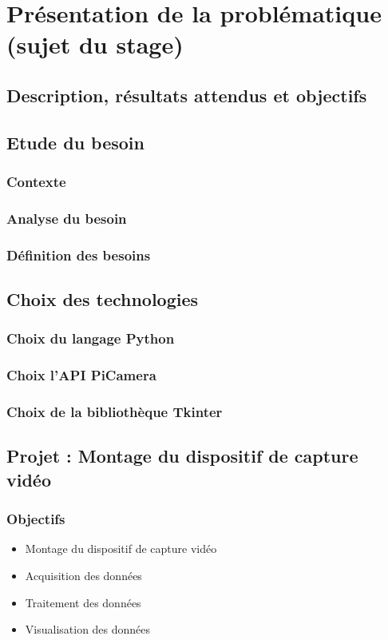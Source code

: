\chapter{Présentation de la problématique (sujet du stage)}
\minitoc

    \section{Description, résultats attendus et objectifs}
    \section{Etude du besoin}
        \subsection{Contexte}
        \subsection{Analyse du besoin}
        \subsection{Définition des besoins}
        
    \section{Choix des technologies}
        \subsection{Choix du langage Python}
        \subsection{Choix l'API PiCamera}
        \subsection{Choix de la bibliothèque Tkinter}
        \section{Projet : Montage du dispositif de capture vidéo}
      
        \subsection{Objectifs}
            \begin{itemize}
                \item Montage du dispositif de capture vidéo
                \item Acquisition des données
                \item Traitement des données
                \item Visualisation des données
            \end{itemize}
    

